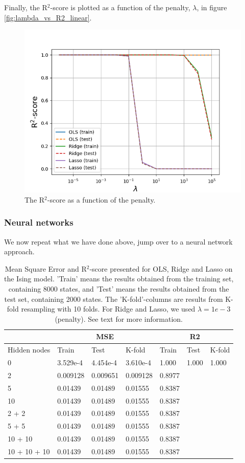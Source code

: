 Finally, the R$^2$-score is plotted as a function of the penalty, $\lambda$, in figure \eqref{fig:lambda_vs_R2_linear}.
\begin{figure} [H]
	\centering
	\includegraphics[scale=0.65]{../plots/lambda_vs_R2_linear.png}
	\caption{The R$^2$-score as a function of the penalty. }
	\label{fig:lambda_vs_R2_linear}
\end{figure} 

\subsubsection{Neural networks}
We now repeat what we have done above, jump over to a neural network approach. 
\begin{table} [H]
	\caption{Mean Square Error and R$^2$-score presented for OLS, Ridge and Lasso on the Ising model. 'Train' means the results obtained from the training set, containing 8000 states, and 'Test' means the results obtained from the test set, containing 2000 states. The 'K-fold'-columns are results from K-fold resampling with 10 folds. For Ridge and Lasso, we used $\lambda=1e-3$ (penalty). See text for more information.}
	\begin{tabularx}{\textwidth}{l|XXX|XXX} \hline\hline
		\label{tab:nn}
		& \multicolumn{3}{c}{\textbf{MSE}}&\multicolumn{3}{c}{\textbf{R2}}\\ \hline
		Hidden nodes&Train&Test&K-fold&Train&Test&K-fold\\ \hline
		0 & 3.529e-4 & 4.454e-4 & 3.610e-4 & 1.000 & 1.000 & 1.000\\
		2 & 0.009128 & 0.009651 & 0.009128 & 0.8977 \\
		5 & 0.01439 & 0.01489 & 0.01555 & 0.8387 \\
		10 & 0.01439 & 0.01489 & 0.01555 & 0.8387 \\
		2 + 2 & 0.01439 & 0.01489 & 0.01555 & 0.8387 \\
		5 + 5 & 0.01439 & 0.01489 & 0.01555 & 0.8387 \\ 
		10 + 10 & 0.01439 & 0.01489 & 0.01555 & 0.8387 \\
		10 + 10 + 10 & 0.01439 & 0.01489 & 0.01555 & 0.8387 \\ \hline
	\end{tabularx}
\end{table}

